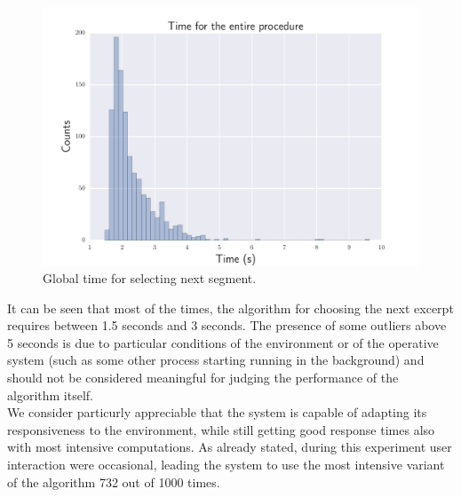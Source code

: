 \begin{figure}[h]
\begin{center}
\includegraphics[scale=0.7]{Figures/bench_procedure.pdf}
  \caption[Global time for selecting next segment]{Global time for selecting next segment.}
  \label{fig:step7}
\end{center}
\end{figure}

It can be seen that most of the times, the algorithm for choosing the next excerpt requires between 1.5 seconds and 3 seconds. The presence of some outliers above 5 seconds is due to particular conditions of the environment or of the operative system (such as some other process starting running in the background) and should not be considered meaningful for judging the performance of the algorithm itself. \\
We consider particurly appreciable that the system is capable of adapting its responsiveness to the environment, while still getting good response times also with most intensive computations. As already stated, during this  experiment user interaction were occasional, leading the system to use the most intensive variant of the algorithm 732 out of 1000 times.\\ \\ \vspace{5cm}

